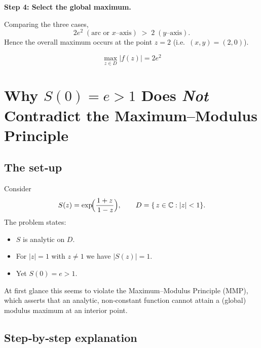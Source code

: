 \documentclass[12pt]{article}
\theoremstyle{definition} %
\theoremstyle{plain} %
\begin{document}
\bigskip
\textbf{Step 4:  Select the global maximum.}

Comparing the three cases,
\[
   2e^{2}\; (\text{arc or $x$–axis}) \;>\;2\; (\text{$y$–axis}).
\]
Hence the overall maximum occurs at the point $z=2$ (i.e.\ $(x,y)=(2,0)$).

\[
  \boxed{\displaystyle \max_{z\in D} |f(z)| = 2e^{2}}
\]

\section*{Why \boldmath$S(0)=e>1$ Does \emph{Not} Contradict the Maximum–Modulus Principle}

\subsection*{The set‑up}

Consider
\[
   S(z)=\exp\!\Bigl(\frac{1+z}{\,1-z}\Bigr),
   \qquad
   D=\{\,z\in\mathbb C:|z|<1\}.
\]
The problem states:
\begin{itemize}
  \item $S$ is analytic on $D$.
  \item For $|z|=1$ with $z\neq 1$ we have $|S(z)|=1$.
  \item Yet $S(0)=e>1$.
\end{itemize}
At first glance this seems to violate the Maximum–Modulus Principle (MMP),
which asserts that an analytic, non‑constant function cannot attain
a (global) modulus maximum at an interior point.

\subsection*{Step‑by‑step explanation}
\end{document}
